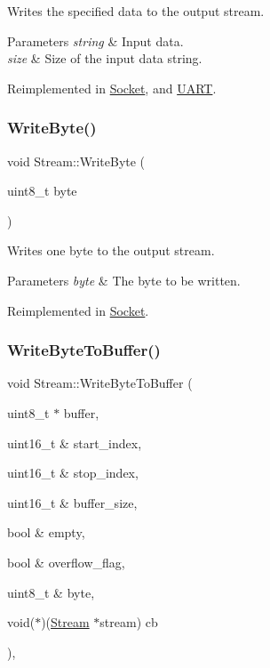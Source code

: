 Writes the specified data to the output stream. 
\begin{DoxyParams}{Parameters}
{\em string} & Input data. \\
\hline
{\em size} & Size of the input data string. \\
\hline
\end{DoxyParams}


Reimplemented in \hyperlink{class_socket_a356ea1b27dbcb15324a4c8aaf85e5ed9}{Socket}, and \hyperlink{class_u_a_r_t_a8bb77ca27b4e17d608d2743313625ac4}{U\+A\+RT}.

\hypertarget{class_stream_aeaed767b3a8d946c6f81465fa83ff17f}{}\label{class_stream_aeaed767b3a8d946c6f81465fa83ff17f} 
\subsubsection{\texorpdfstring{Write\+Byte()}{WriteByte()}}
{\footnotesize\ttfamily void Stream\+::\+Write\+Byte (\begin{DoxyParamCaption}\item[{uint8\+\_\+t}]{byte }\end{DoxyParamCaption})\hspace{0.3cm}{\ttfamily [virtual]}}

Writes one byte to the output stream. 
\begin{DoxyParams}{Parameters}
{\em byte} & The byte to be written. \\
\hline
\end{DoxyParams}


Reimplemented in \hyperlink{class_socket_a548abd20eea1430230a77829e99c818a}{Socket}.

\hypertarget{class_stream_a7b6a9a1f96e0f524e950863215128911}{}\label{class_stream_a7b6a9a1f96e0f524e950863215128911} 
\subsubsection{\texorpdfstring{Write\+Byte\+To\+Buffer()}{WriteByteToBuffer()}}
{\footnotesize\ttfamily void Stream\+::\+Write\+Byte\+To\+Buffer (\begin{DoxyParamCaption}\item[{uint8\+\_\+t $\ast$}]{buffer,  }\item[{uint16\+\_\+t \&}]{start\+\_\+index,  }\item[{uint16\+\_\+t \&}]{stop\+\_\+index,  }\item[{uint16\+\_\+t \&}]{buffer\+\_\+size,  }\item[{bool \&}]{empty,  }\item[{bool \&}]{overflow\+\_\+flag,  }\item[{uint8\+\_\+t \&}]{byte,  }\item[{void($\ast$)(\hyperlink{class_stream}{Stream} $\ast$stream)}]{cb }\end{DoxyParamCaption})\hspace{0.3cm}{\ttfamily [protected]}, {\ttfamily [virtual]}}

